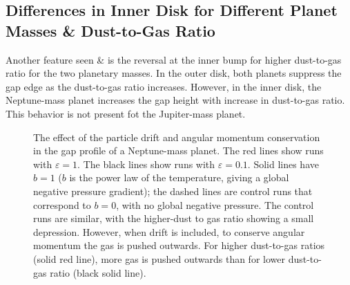 \documentclass[onecolumn]{report}
\begin{document}
\subsection{Differences in Inner Disk for Different Planet Masses \& Dust-to-Gas Ratio}

Another feature seen  \&  is the reversal at the inner bump for higher dust-to-gas ratio for the two planetary masses. In the outer disk, both planets suppress the gap edge as the dust-to-gas ratio increases. However, in the inner disk, the Neptune-mass planet increases the gap height with increase in dust-to-gas ratio. This behavior is not present fot the Jupiter-mass planet.\par

\begin{figure}
  \begin{center}
  \end{center}
  \caption{The effect of the particle drift and angular
    momentum conservation in the gap profile of a
    Neptune-mass planet. The red lines show runs with
    $\varepsilon=1$. The black lines show runs with $\varepsilon=0.1$. Solid lines have $b=1	$ ($b$ is
    the power law of the temperature, giving a global negative pressure
    gradient); the dashed lines are control runs that correspond to $b=0$, with no global
    negative pressure. The control runs are similar, with the
    higher-dust to gas ratio showing a small depression. However, when
    drift is included, to conserve angular momentum the gas is pushed
    outwards. For higher dust-to-gas ratios (solid red line),
    more gas is pushed outwards than for lower dust-to-gas ratio (black
    solid line).}
  \label{fig:drift}
\end{figure}
\end{document}
